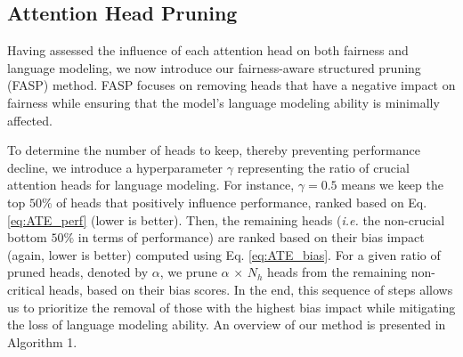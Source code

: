\documentclass[letterpaper]{article} %
\begin{document}
\subsection{Attention Head Pruning}
Having assessed the influence of each attention head on both fairness and language modeling, we now introduce our %
fairness-aware structured pruning (FASP) method. FASP focuses on removing heads that have a negative impact on fairness while ensuring that the model's language modeling ability is minimally affected.

To determine the number of heads to keep, thereby preventing performance decline, we introduce a hyperparameter $\gamma$ representing the ratio of crucial attention heads for language modeling. For instance, $\gamma = 0.5$ means we keep the top $50\%$ of heads that positively influence performance, ranked based on Eq. \eqref{eq:ATE_perf} (lower is better). Then, the remaining heads (\textit{i.e.} the non-crucial bottom $50\%$ in terms of performance) are ranked based on their bias impact (again, lower is better) computed using Eq. \eqref{eq:ATE_bias}. For a given ratio of pruned heads, denoted by $\alpha$, we prune $\alpha$ $\times$ $N_h$ heads from the remaining non-critical heads, based on their bias scores.
In the end, this sequence of steps allows us to prioritize the removal of those with the highest bias impact while mitigating the loss of language modeling ability. An overview of our method is presented in Algorithm 1.
\end{document}
